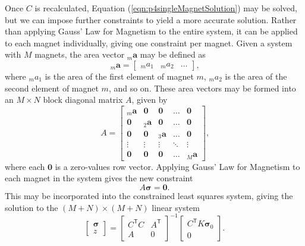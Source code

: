 Once \(C\) is recalculated, Equation (\ref{eqn:p4singleMagnetSolution}) may be solved, but we can impose further constraints to yield a more accurate solution. Rather than applying Gauss' Law for Magnetism to the entire system, it can be applied to each magnet individually, giving one constraint per magnet. Given a system with \(M\) magnets, the area vector \(_m\mathbf{a}\) may be defined as
\begin{equation}
    _m\mathbf{a} = \begin{bmatrix} _ma_1 & _ma_2 & \dots \end{bmatrix} \text{,}
\end{equation}
where \(_ma_1\) is the area of the first element of magnet \(m\), \(_ma_2\) is the area of the second element of magnet \(m\), and so on. These area vectors may be formed into an \(M \times N\) block diagonal matrix \(A\), given by
\begin{equation}\label{eqn:p4AEquation}
    A = \begin{bmatrix} _m\mathbf{a} & \bm{0} & \bm{0} & \dots & \bm{0} \\
    \bm{0} & _2\mathbf{a} & \bm{0} & \dots & \bm{0} \\
    \bm{0} & \bm{0} & _3\mathbf{a} & \dots & \bm{0} \\
    \vdots & \vdots & \vdots & \ddots & \vdots \\
    \bm{0} & \bm{0} & \bm{0} & \dots & _M\mathbf{a} \end{bmatrix} \text{,}
\end{equation}
where each \(\bm{0}\) is a zero-values row vector. Applying Gauss' Law for Magnetism to each magnet in the system gives the new constraint
\begin{equation}
    A\bm{\sigma} = \bm{0} \text{.}
\end{equation}
This may be incorporated into the constrained least squares system, giving the solution to the \(\left(M+N\right)\times\left(M+N\right)\) linear system
\begin{equation}\label{eqn:p4multiMagnetSolution}
    \begin{bmatrix} \bm{\sigma} \\ z \end{bmatrix} = \begin{bmatrix} C^\mathsf{T}C & A^\mathsf{T} \\ A & 0 \end{bmatrix}^{-1} \begin{bmatrix} C^\mathsf{T} K \bm{\sigma}_0 \\ 0 \end{bmatrix} \text{.}
\end{equation}

